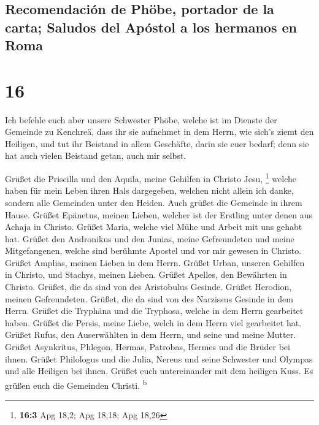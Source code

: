 \hypertarget{recomendaciuxf3n-de-phuxf6be-portador-de-la-carta-saludos-del-apuxf3stol-a-los-hermanos-en-roma}{%
\subsection{Recomendación de Phöbe, portador de la carta; Saludos del
Apóstol a los hermanos en
Roma}\label{recomendaciuxf3n-de-phuxf6be-portador-de-la-carta-saludos-del-apuxf3stol-a-los-hermanos-en-roma}}

\hypertarget{section-15}{%
\section{16}\label{section-15}}

 Ich befehle euch aber unsere Schwester Phöbe, welche ist
im Dienste der Gemeinde zu Kenchreä,  dass ihr sie
aufnehmet in dem Herrn, wie sich's ziemt den Heiligen, und tut ihr
Beistand in allem Geschäfte, darin sie euer bedarf; denn sie hat auch
vielen Beistand getan, auch mir selbst.

 Grüßet die Priscilla und den Aquila, meine Gehilfen in
Christo Jesu, \footnote{\textbf{16:3} Apg 18,2; Apg 18,18; Apg 18,26}
 welche haben für mein Leben ihren Hals dargegeben,
welchen nicht allein ich danke, sondern alle Gemeinden unter den Heiden.
 Auch grüßet die Gemeinde in ihrem Hause. Grüßet Epänetus,
meinen Lieben, welcher ist der Erstling unter denen aus Achaja in
Christo.  Grüßet Maria, welche viel Mühe und Arbeit mit
uns gehabt hat.  Grüßet den Andronikus und den Junias,
meine Gefreundeten und meine Mitgefangenen, welche sind berühmte Apostel
und vor mir gewesen in Christo.  Grüßet Amplias, meinen
Lieben in dem Herrn.  Grüßet Urban, unseren Gehilfen in
Christo, und Stachys, meinen Lieben.  Grüßet Apelles, den
Bewährten in Christo. Grüßet, die da sind von des Aristobulus Gesinde.
 Grüßet Herodion, meinen Gefreundeten. Grüßet, die da
sind von des Narzissus Gesinde in dem Herrn.  Grüßet die
Tryphäna und die Tryphosa, welche in dem Herrn gearbeitet haben. Grüßet
die Persis, meine Liebe, welch in dem Herrn viel gearbeitet hat.
 Grüßet Rufus, den Auserwählten in dem Herrn, und seine
und meine Mutter.  Grüßet Asynkritus, Phlegon, Hermas,
Patrobas, Hermes und die Brüder bei ihnen.  Grüßet
Philologus und die Julia, Nereus und seine Schwester und Olympas und
alle Heiligen bei ihnen.  Grüßet euch untereinander mit
dem heiligen Kuss. Es grüßen euch die Gemeinden Christi.
\textsuperscript{b}

